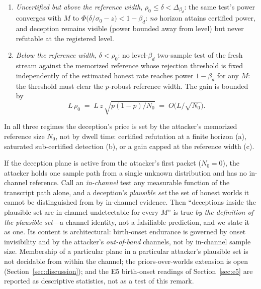 \begin{theorem}
\begin{enumerate}[label=(\roman*),leftmargin=2em]
\begin{enumerate}[label=(\alph*),leftmargin=2em]
        power is $\approx0.50$, and at the two middle registered cells
        ($\delta/\sigma_0=2.76<3.6$) the limiting power is
        $\Phi(0.80)=0.79$; the one-sided exact binomial UMP on the $N_0$
        reference draws has power $0.850$ at $(10,0.4)$ and $0.807$ at
        $(40,0.2)$ (one-sided normal analogue $0.868$) for \emph{every} $M$.
  \item \emph{Uncertified but above the reference width},
        $\rho_0\le\delta<\Delta_{\beta_d}$: the same test's power
        converges with $M$ to
        $\Phi\!\bigl(\delta/\sigma_0-z\bigr)<1-\beta_d$: \emph{no} horizon
        attains certified power, and deception remains visible (power
        bounded away from level) but never refutable at the registered
        level.
  \item \emph{Below the reference width}, $\delta<\rho_0$: no
        level-$\beta_d$ two-sample test of the fresh stream against the
        memorized reference whose rejection threshold is fixed
        independently of the estimated honest rate reaches power
        $1-\beta_d$ for any $M$: the threshold must clear the $p$-robust
        reference width. The gain is bounded by
        \[
        L\,\rho_0\;=\;L\,z\,\sqrt{p(1-p)/N_0}
        \;=\;O\bigl(L/\sqrt{N_0}\bigr).
        \]
  \end{enumerate}
  In all three regimes the deception's price is set by the attacker's
  memorized reference size $N_0$, not by dwell time: certified refutation
  at a finite horizon (a), saturated sub-certified detection (b), or a
  gain capped at the reference width (c).
\end{enumerate}
\end{theorem}

\begin{remark}\label{rem:birth}
If the deception plane is active from the attacker's first packet
($N_0=0$), the attacker holds one sample path from a single unknown
distribution and has no in-channel reference. Call an \emph{in-channel}
test any measurable function of the transcript path alone, and a
deception's \emph{plausible set} the set of honest worlds it cannot be
distinguished from by in-channel evidence. Then ``deceptions inside the
plausible set are in-channel undetectable for every $M$'' is true
\emph{by the definition of the plausible set}---a channel identity, not a
falsifiable prediction, and we state it as one. Its content is
architectural: birth-onset endurance is governed by onset invisibility
and by the attacker's \emph{out-of-band} channels, not by in-channel
sample size. Membership of a particular plane in a particular attacker's
plausible set is not decidable from within the channel; the
priors-over-worlds extension is open (Section~\ref{sec:discussion}); and
the E5 birth-onset readings of Section~\ref{sec:e5} are reported as
descriptive statistics, not as a test of this remark.
\end{remark}


